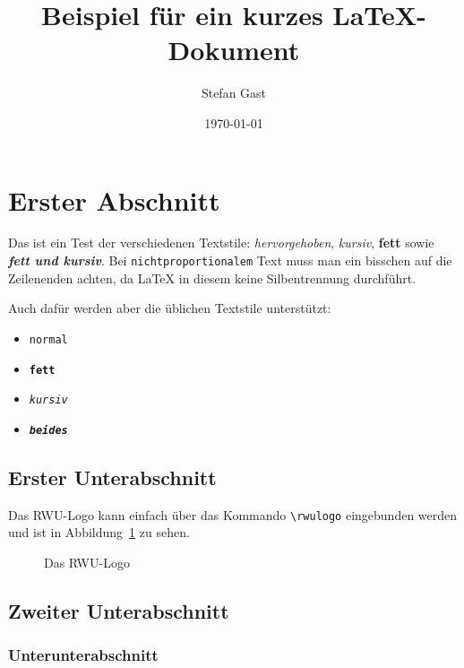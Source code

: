\documentclass{scrartcl}
\title{Beispiel für ein kurzes \LaTeX-Dokument}
\author{Stefan Gast}
\date{\today}
\begin{document}
	\maketitle
	\tableofcontents

	\clearpage

	\section{Erster Abschnitt}

		Das ist ein Test der verschiedenen Textstile:
		\emph{hervorgehoben}, \textit{kursiv}, \textbf{fett} sowie
		\textit{\textbf{fett und kursiv}}.
		Bei \texttt{nichtproportionalem} Text muss man ein bisschen
		auf die Zeilenenden achten, da \LaTeX{} in diesem keine
		Silbentrennung durchführt.

		Auch dafür werden aber die üblichen Textstile unterstützt:
		\begin{itemize}
			\item \texttt{normal}
			\item \texttt{\textbf{fett}}
			\item \texttt{\textit{kursiv}}
			\item \texttt{\textbf{\textit{beides}}}
		\end{itemize}

		\subsection{Erster Unterabschnitt}

			Das RWU-Logo kann einfach über das Kommando
			\verb?\rwulogo? eingebunden werden und ist in
			Abbildung~\ref{fig:logo} zu sehen.

			\begin{figure}[hb]
				\centering
				\rwulogo[width=0.5\columnwidth]
				\caption{Das RWU-Logo}
				\label{fig:logo}
			\end{figure}

		\subsection{Zweiter Unterabschnitt}

			\lipsum[1]

			\subsubsection{Unterunterabschnitt}

			\lipsum[2-5]
\end{document}
